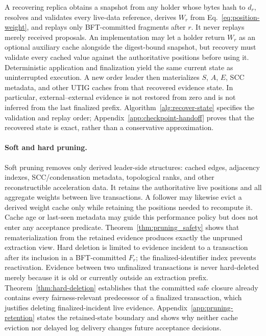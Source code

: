 A recovering replica obtains a snapshot from any holder whose bytes hash to
$d_r$, resolves and validates every live-data reference, derives $W_r$ from
Eq.~\eqref{eq:position-weight}, and replays only
BFT-committed fragments after $r$.  It never replays merely received
proposals.  An implementation may let a holder return $W_r$ as an optional
auxiliary cache alongside the digest-bound snapshot, but recovery must
validate every cached value against the authoritative positions before using
it.  Deterministic application and
finalization yield the same current state as uninterrupted execution.  A new
order leader then
materializes $S$, $A$, $E$, SCC metadata, and other UTIG caches from that
recovered evidence state.  In particular, external--external evidence is not
restored from zero and is not inferred from the last finalized prefix.
Algorithm~\ref{alg:recover-state} specifies the validation and replay order;
Appendix~\ref{app:checkpoint-handoff} proves that the recovered state is exact,
rather than a conservative approximation.

\paragraph{Soft and hard pruning.}
Soft pruning removes only derived leader-side structures: cached edges,
adjacency indexes, SCC/condensation metadata, topological ranks, and other
reconstructible acceleration data.  It retains the authoritative live
positions and all aggregate weights between live transactions.  A follower may
likewise evict a derived weight cache only while retaining the positions needed
to recompute it.  Cache age or last-seen metadata may guide this performance
policy but does not enter any acceptance predicate.
Theorem~\ref{thm:pruning_safety} shows that rematerialization from the retained
evidence produces exactly the unpruned extraction view.  Hard deletion is
limited to evidence incident to a transaction after its inclusion in a
BFT-committed $F_r$; the finalized-identifier index prevents reactivation.
Evidence between two unfinalized transactions is never hard-deleted merely
because it is old or currently outside an extraction prefix.
Theorem~\ref{thm:hard-deletion} establishes that the committed safe closure
already contains every fairness-relevant predecessor of a finalized
transaction, which justifies deleting finalized-incident live evidence.
Appendix~\ref{app:pruning-retention} states the retained-state boundary and
shows why neither cache eviction nor delayed log delivery changes future
acceptance decisions.


